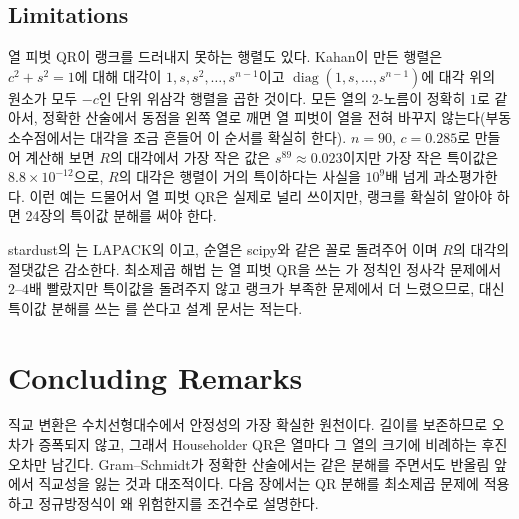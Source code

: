 \subsection{Limitations}

열 피벗 QR이 랭크를 드러내지 못하는 행렬도 있다. Kahan이 만든 행렬은 $c^2+s^2=1$에 대해 대각이 $1,s,s^2,\dots,s^{n-1}$이고 $\operatorname{diag}(1,s,\dots,s^{n-1})$에 대각 위의 원소가 모두 $-c$인 단위 위삼각 행렬을 곱한 것이다. 모든 열의 2-노름이 정확히 $1$로 같아서, 정확한 산술에서 동점을 왼쪽 열로 깨면 열 피벗이 열을 전혀 바꾸지 않는다(부동소수점에서는 대각을 조금 흔들어 이 순서를 확실히 한다)\cite{kahan1966numerical}. $n=90$, $c=0.285$로 만들어 계산해 보면 $R$의 대각에서 가장 작은 값은 $s^{89}\approx0.023$이지만 가장 작은 특이값은 $8.8\times10^{-12}$으로, $R$의 대각은 행렬이 거의 특이하다는 사실을 $10^9$배 넘게 과소평가한다. 이런 예는 드물어서 열 피벗 QR은 실제로 널리 쓰이지만, 랭크를 확실히 알아야 하면 24장의 특이값 분해를 써야 한다.

\begin{instardust}
stardust의 는 LAPACK의 이고, 순열은 scipy와 같은 꼴로 돌려주어 이며 $R$의 대각의 절댓값은 감소한다. 최소제곱 해법 는 열 피벗 QR을 쓰는 가 정칙인 정사각 문제에서 $2$--$4$배 빨랐지만 특이값을 돌려주지 않고 랭크가 부족한 문제에서 더 느렸으므로, 대신 특이값 분해를 쓰는 를 쓴다고 설계 문서는 적는다.
\end{instardust}

\section{Concluding Remarks}

직교 변환은 수치선형대수에서 안정성의 가장 확실한 원천이다. 길이를 보존하므로 오차가 증폭되지 않고, 그래서 Householder QR은 열마다 그 열의 크기에 비례하는 후진 오차만 남긴다. Gram--Schmidt가 정확한 산술에서는 같은 분해를 주면서도 반올림 앞에서 직교성을 잃는 것과 대조적이다. 다음 장에서는 QR 분해를 최소제곱 문제에 적용하고 정규방정식이 왜 위험한지를 조건수로 설명한다.

\chapterreferences
